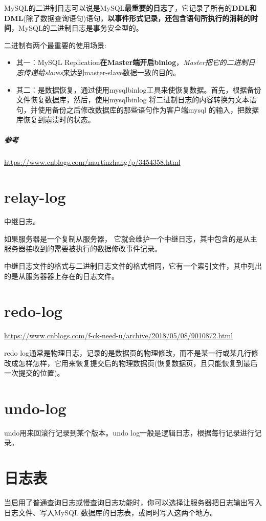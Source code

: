 \documentclass[UTF8,a4paper,12pt]{ctexbook}
\begin{document}
		MySQL的二进制日志可以说是MySQL\textbf{最重要的日志}了，它记录了所有的\textbf{DDL和DML}(除了数据查询语句)语句，\textbf{以事件形式记录，还包含语句所执行的消耗的时间}，MySQL的二进制日志是事务安全型的。
		
		二进制有两个最重要的使用场景: 
			\begin{itemize}
				\item 其一：MySQL Replication\textbf{在Master端开启binlog}，\textit{Master把它的二进制日志传递给slaves}来达到master-slave数据一致的目的。 
				\item 其二：是数据恢复，通过使用mysqlbinlog工具来使恢复数据。首先，根据备份文件恢复数据库，然后，使用mysqlbinlog 将二进制日志的内容转换为文本语句，并使用备份之后修改数据库的那些语句作为客户端mysql 的输入，把数据库恢复到崩溃时的状态。
			\end{itemize}    
		    
		\subparagraph{参考}
			\url{https://www.cnblogs.com/martinzhang/p/3454358.html}		
	
	
	\section{relay-log}
		中继日志。
		
		如果服务器是一个复制从服务器， 它就会维护一个中继日志，其中包含的是从主服务器接收到的需要被执行的数据修改事件记录。
		
		中继日志文件的格式与二进制日志文件的格式相同，它有一个索引文件，其中列出的是从服务器器上存在的日志文件。
	
	
	\section{redo-log}
		\url{https://www.cnblogs.com/f-ck-need-u/archive/2018/05/08/9010872.html}
		
		redo log通常是物理日志，记录的是数据页的物理修改，而不是某一行或某几行修改成怎样怎样，它用来恢复提交后的物理数据页(恢复数据页，且只能恢复到最后一次提交的位置)。
	
	
	\section{undo-log}
		undo用来回滚行记录到某个版本。undo log一般是逻辑日志，根据每行记录进行记录。
		
	
	\section{日志表}
		当启用了普通查询日志或慢查询日志功能时，你可以选择让服务器把日志输出写入日志文件、写入MySQL 数据库的日志表，或同时写入这两个地方。
		
\end{document}
